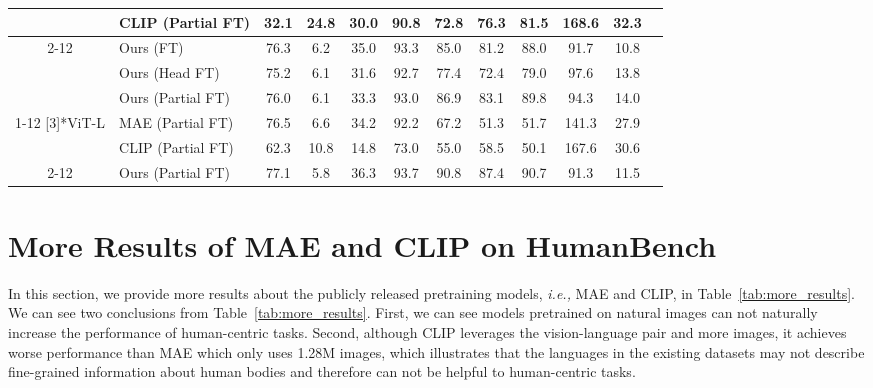 \documentclass[10pt,twocolumn,letterpaper]{article}
\begin{document}
\begin{table*}[t]
\begin{tabular}{cl|cccccccccc}
          & CLIP (Partial FT) & 32.1  & 24.8  & 30.0  & \cellcolor[rgb]{ .949,  .949,  .949} 90.8  & 72.8  & 76.3  & \cellcolor[rgb]{ .949,  .949,  .949} 81.5  & 168.6  & 32.3  &  \\
\cmidrule{2-12}          & Ours (FT) & 76.3  & 6.2   & 35.0  & \cellcolor[rgb]{ .949,  .949,  .949} 93.3  & 85.0  & 81.2  & \cellcolor[rgb]{ .949,  .949,  .949} 88.0  & 91.7  & 10.8  &  \\
          & Ours (Head FT) & 75.2  & 6.1   & 31.6  & \cellcolor[rgb]{ .949,  .949,  .949} 92.7  & 77.4  & 72.4  & \cellcolor[rgb]{ .949,  .949,  .949} 79.0  & 97.6   &  13.8  &  \\
          & Ours (Partial FT) & 76.0  & 6.1   & 33.3  & \cellcolor[rgb]{ .949,  .949,  .949} 93.0  & 86.9  & 83.1  & \cellcolor[rgb]{ .949,  .949,  .949} 89.8  & 94.3   & 14.0  &  \\
\cmidrule{1-12}
    \multirow{3}[3]{*}{ViT-L} & MAE (Partial FT) & 76.5  & 6.6   & 34.2  & \cellcolor[rgb]{ .949,  .949,  .949} 92.2  & 67.2  & 51.3  & \cellcolor[rgb]{ .949,  .949,  .949} 51.7  & 141.3  & 27.9  &  \\
          & CLIP (Partial FT) & 62.3  & 10.8  & 14.8  & \cellcolor[rgb]{ .949,  .949,  .949} 73.0  & 55.0  & 58.5  & \cellcolor[rgb]{ .949,  .949,  .949} 50.1  & 167.6  & 30.6  &  \\
\cmidrule{2-12}          & Ours (Partial FT) & 77.1  & 5.8   & 36.3  & \cellcolor[rgb]{ .949,  .949,  .949} 93.7  & 90.8  & 87.4  & \cellcolor[rgb]{ .949,  .949,  .949} 90.7  & 91.3  & 11.5  &  \\
    \bottomrule
    \end{tabular}\label{tab:more_results}\end{table*}




\section{More Results of MAE and CLIP on HumanBench}
In this section, we provide more results about the publicly released pretraining models, \emph{i.e.,} MAE and CLIP, in Table~\ref{tab:more_results}. We can see two conclusions from Table~\ref{tab:more_results}. First, we can see models pretrained on natural images can not naturally increase the performance of human-centric tasks. Second, although CLIP leverages the vision-language pair and more images, it achieves worse performance than MAE which only uses 1.28M images, which illustrates that the languages in the existing datasets may not describe fine-grained information about human bodies and therefore can not be helpful to human-centric tasks.
\end{document}

